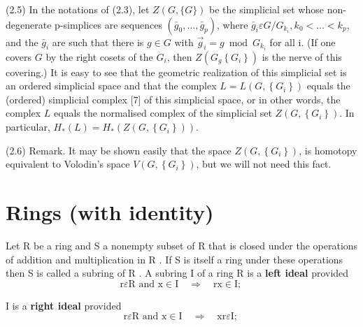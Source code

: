 (2.5) In the notations of (2.3), let $Z(G,\{G\})$ be the simplicial set whose non-degenerate p-simplices are sequences $\left(\bar{g}_0, \ldots, \bar{g}_p\right)$, where $\bar{g}_i \varepsilon G / G_{k_i}, k_0<\ldots<k_p$, and the $\bar{g}_i$ are such that there is $g \in G$ with $\vec{g}_i=g \bmod G_{k_i}$ for all i. (If one covers $G$ by the right cosets of the $G_i$, then $Z\left(G_g\left\{G_i\right\}\right)$ is the nerve of this covering.) It is easy to see that the geometric realization of this simplicial set is an ordered simplicial space and that the complex $L=L\left(G,\left\{G_i\right\}\right)$ equals the (ordered) simplicial complex [7] of this simplicial space, or in other words, the complex $L$ equals the normalised complex of the simplicial set $Z\left(G,\left\{G_i\right\}\right)$. In particular, $H_*(L)=H_*\left(Z\left(G,\left\{G_i\right\}\right)\right)$.

(2.6) Remark. It may be shown easily that the space $Z\left(G,\left\{G_i\right\}\right)$, is homotopy equivalent to Volodin's space $V\left(G,\left\{G_i\right\}\right)$, but we will not need this fact.




\chapter{Rings (with identity)}

Let R be a ring and S a nonempty subset of R that is closed under the operations of addition and multiplication in R . If S is itself a ring under these operations then S is called a subring of R . A subring I of a ring R is a \textbf{left ideal} provided
$$
\mathrm{r} \varepsilon \mathrm{R} \text { and } \mathrm{x} \in \mathrm{I} \quad \Rightarrow \quad \mathrm{rx} \in \mathrm{I} \text {; }
$$

I is a \textbf{right ideal} provided
$$
\mathrm{r} \varepsilon \mathrm{R} \text { and } \mathrm{x} \in \mathrm{I} \quad \Rightarrow \quad \mathrm{xr} \varepsilon \mathrm{I} \text {; }
$$

